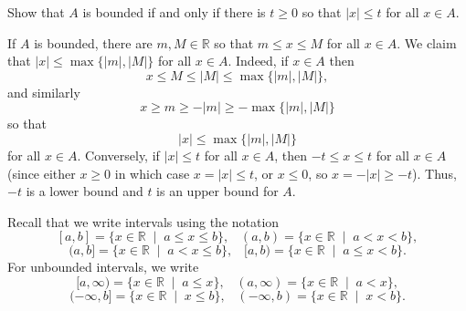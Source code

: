 \documentclass[11pt,dvipsnames]{book}
\numberwithin{equation}{section} %
\numberwithin{figure}{section} %
\numberwithin{table}{section} %
\begin{document}
\begin{exercise}
\label{ex:bounded}
Show that $A$ is bounded if and only if there is $t\geq 0$ so that  $|x|\leq t$ for all $x\in A$.
\begin{solution}
If $A$ is bounded, there are $m,M\in\mathbb{R}$ so that $m\leq x\leq M$ for all $x\in A$. We claim that $|x|\leq \max\{|m|,|M|\}$ for all $x\in A$. Indeed, if $x\in A$ then 
\[
x\leq M\leq  |M| \leq \max\{|m|,|M|\},
\]
and similarly
\[
x\geq m \geq - |m| \geq -\max\{|m|,|M|\}
\]
so that
\[|x|\leq \max\{|m|,|M|\}\]
for all $x\in A$.
Conversely, if $|x|\leq t$ for all $x\in A$, then $-t\leq x\leq t$ for all $x\in A$ (since either $x\geq 0$ in which case $x=|x|\leq t$, or $x\leq 0$, so $x=-|x|\geq -t$). Thus, $-t$ is a lower bound and $t$ is an upper bound for $A$.
\end{solution}
\end{exercise}

Recall that we write intervals using the notation
\[
[a,b]=\{x\in\mathbb{R} \;\; | \;\; a\leq x\leq b\}, \;\;\;
(a,b)=\{x\in\mathbb{R} \;\; | \;\; a< x< b\}, 
\]
\[
(a,b]=\{x\in\mathbb{R} \;\; | \;\; a< x\leq b\}, \;\;\;
[a,b)=\{x\in\mathbb{R} \;\; | \;\; a\leq  x< b\}.
\]
For unbounded intervals, we write
\[
[a,\infty)=\{x\in\mathbb{R} \;\; | \;\; a\leq x \}, \;\;\;
(a,\infty)=\{x\in\mathbb{R} \;\; | \;\; a< x \}, 
\]
\[
(-\infty,b]=\{x\in\mathbb{R} \;\; | \;\;  x\leq b\}, \;\;\;
(-\infty,b)=\{x\in\mathbb{R} \;\; | \;\; x< b\}.
\]

 
\end{document}
